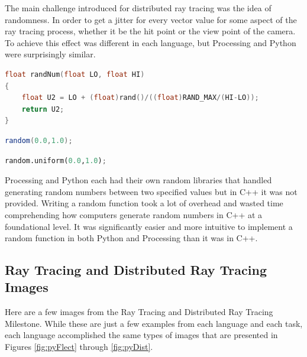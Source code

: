 The main challenge introduced for distributed ray tracing was the idea of randomness.  In order to get a jitter for every vector value for some aspect of the ray tracing process, whether it be the hit point or the view point of the camera.  To achieve this effect was different in each language, but Processing and Python were surprisingly similar.

\singlespacing
\begin{lstlisting}[language=C++, caption=C++ Random Function, style=mystyle, label=c++Rand]
float randNum(float LO, float HI)
{
    float U2 = LO + (float)rand()/((float)RAND_MAX/(HI-LO));
    return U2;
}
\end{lstlisting}
\begin{lstlisting}[language=Java, caption=Processing Random Function, style=mystyle, label=processingRand]
random(0.0,1.0);
\end{lstlisting}
\begin{lstlisting}[language=Python, caption=Python Random Function, style=mystyle, label=pythonRand]
random.uniform(0.0,1.0);
\end{lstlisting}
\doublespacing

Processing and Python each had their own random libraries that handled generating random numbers between two specified values but in C++ it was not provided.  Writing a random function took a lot of overhead and wasted time comprehending how computers generate random numbers in C++ at a foundational level.  It was significantly easier and more intuitive to implement a random function in both Python and Processing than it was in C++.

\subsection{Ray Tracing and Distributed Ray Tracing Images}
Here are a few images from the Ray Tracing and Distributed Ray Tracing Milestone.  While these are just a few examples from each language and each task, each language accomplished the same types of images that are presented in Figures \ref{fig:pyFlect} through \ref{fig:pyDist}.

